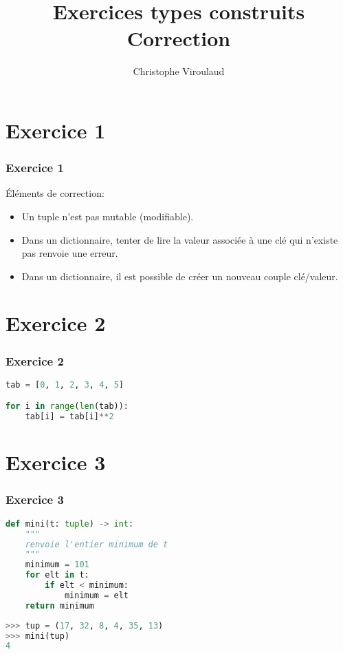 \documentclass[svgnames,11pt]{beamer}
\author[]{Christophe Viroulaud}
\title{Exercices types construits\\Correction}
\date{\framebox{\textbf{DonRep 09}}}
\institute{Première - NSI}
\begin{document}
\begin{frame}
\titlepage
\end{frame}
\section{Exercice 1}
\begin{frame}
    \frametitle{Exercice 1}
Éléments de correction:
\begin{itemize}
    \item Un tuple n'est pas mutable (modifiable).
    \item Dans un dictionnaire, tenter de lire la valeur associée à une clé qui n'existe pas renvoie une erreur.
    \item Dans un dictionnaire, il est possible de créer un nouveau couple clé/valeur.
\end{itemize}

\end{frame}
\section{Exercice 2}
\begin{frame}[fragile]
    \frametitle{Exercice 2}

\begin{lstlisting}[language=Python , basicstyle=\ttfamily\small, xleftmargin=2em, xrightmargin=2em]
tab = [0, 1, 2, 3, 4, 5]

for i in range(len(tab)):
    tab[i] = tab[i]**2
\end{lstlisting}

\end{frame}
\section{Exercice 3}
\begin{frame}[fragile]
    \frametitle{Exercice 3}

\begin{lstlisting}[language=Python , basicstyle=\ttfamily\small, xleftmargin=2em, xrightmargin=2em]
def mini(t: tuple) -> int:
    """
    renvoie l'entier minimum de t
    """
    minimum = 101
    for elt in t:
        if elt < minimum:
            minimum = elt
    return minimum
\end{lstlisting}

\begin{center}
\begin{lstlisting}[language=Python , basicstyle=\ttfamily\small, xleftmargin=2em, xrightmargin=2em]
>>> tup = (17, 32, 8, 4, 35, 13)
>>> mini(tup)
4
\end{lstlisting}
\label{CODE}
\end{center}
\end{frame}
\end{document}
